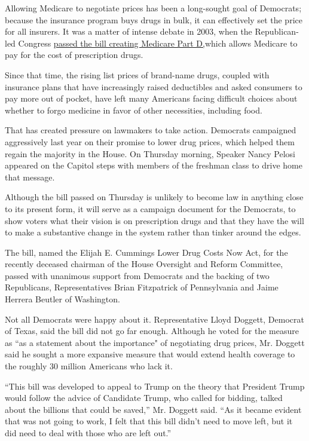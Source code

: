 Allowing Medicare to negotiate prices has been a long-sought goal of
Democrats; because the insurance program buys drugs in bulk, it can
effectively set the price for all insurers. It was a matter of intense
debate in 2003, when the Republican-led Congress
\href{https://www.nytimes3xbfgragh.onion/2003/06/27/us/house-and-senate-pass-measures-for-broad-overhaul-of-medicare.html}{passed
the bill creating Medicare Part D,}which allows Medicare to pay for the
cost of prescription drugs.

Since that time, the rising list prices of brand-name drugs, coupled
with insurance plans that have increasingly raised deductibles and asked
consumers to pay more out of pocket, have left many Americans facing
difficult choices about whether to forgo medicine in favor of other
necessities, including food.

That has created pressure on lawmakers to take action. Democrats
campaigned aggressively last year on their promise to lower drug prices,
which helped them regain the majority in the House. On Thursday morning,
Speaker Nancy Pelosi appeared on the Capitol steps with members of the
freshman class to drive home that message.

Although the bill passed on Thursday is unlikely to become law in
anything close to its present form, it will serve as a campaign document
for the Democrats, to show voters what their vision is on prescription
drugs and that they have the will to make a substantive change in the
system rather than tinker around the edges.

The bill, named the Elijah E. Cummings Lower Drug Costs Now Act, for the
recently deceased chairman of the House Oversight and Reform Committee,
passed with unanimous support from Democrats and the backing of two
Republicans, Representatives Brian Fitzpatrick of Pennsylvania and Jaime
Herrera Beutler of Washington.

Not all Democrats were happy about it. Representative Lloyd Doggett,
Democrat of Texas, said the bill did not go far enough. Although he
voted for the measure as ``as a statement about the importance" of
negotiating drug prices, Mr. Doggett said he sought a more expansive
measure that would extend health coverage to the roughly 30 million
Americans who lack it.

``This bill was developed to appeal to Trump on the theory that
President Trump would follow the advice of Candidate Trump, who called
for bidding, talked about the billions that could be saved,'' Mr.
Doggett said. ``As it became evident that was not going to work, I felt
that this bill didn't need to move left, but it did need to deal with
those who are left out.''

